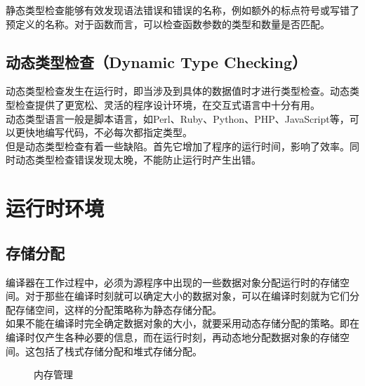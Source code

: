 静态类型检查能够有效发现语法错误和错误的名称，例如额外的标点符号或写错了预定义的名称。对于函数而言，可以检查函数参数的类型和数量是否匹配。\\

\subsection{动态类型检查（Dynamic Type Checking）}

动态类型检查发生在运行时，即当涉及到具体的数据值时才进行类型检查。动态类型检查提供了更宽松、灵活的程序设计环境，在交互式语言中十分有用。\\

动态类型语言一般是脚本语言，如Perl、Ruby、Python、PHP、JavaScript等，可以更快地编写代码，不必每次都指定类型。\\

但是动态类型检查有着一些缺陷。首先它增加了程序的运行时间，影响了效率。同时动态类型检查错误发现太晚，不能防止运行时产生出错。

\newpage

\section{运行时环境}

\subsection{存储分配}

编译器在工作过程中，必须为源程序中出现的一些数据对象分配运行时的存储空间。对于那些在编译时刻就可以确定大小的数据对象，可以在编译时刻就为它们分配存储空间，这样的分配策略称为静态存储分配。\\

如果不能在编译时完全确定数据对象的大小，就要采用动态存储分配的策略。即在编译时仅产生各种必要的信息，而在运行时刻，再动态地分配数据对象的存储空间。这包括了栈式存储分配和堆式存储分配。\\

\begin{figure}[H]
    \centering
    \caption{内存管理}
\end{figure}

